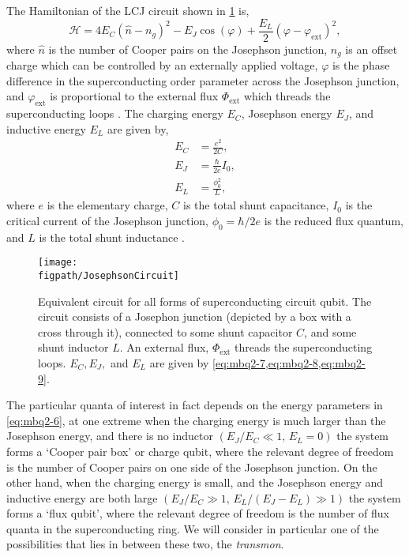The Hamiltonian of the LCJ circuit shown in \cref{fig:mbq2-2} is,
\begin{equation}
	\mathcal{H} = 4E_{C}(\hat{n} - n_{g})^{2} - E_{J}\cos(\varphi) + \frac{E_{L}}{2} (\varphi - \varphi_{\mathrm{ext}})^{2},
	\label{eq:mbq2-6}
\end{equation}
where \(\hat{n}\) is the number of Cooper pairs on the Josephson junction, \(n_{g}\) is an offset charge which can be controlled by an externally applied voltage, \(\varphi\) is the phase difference in the superconducting order parameter across the Josephson junction, and \(\varphi_{\mathrm{ext}}\) is proportional to the external flux \(\Phi_{\mathrm{ext}}\) which threads the superconducting loops \cite{Vool2017}. The charging energy \(E_{C}\), Josephson energy \(E_{J}\), and inductive energy \(E_{L}\) are given by,
\begin{align}
	E_{C} &= \frac{e^{2}}{2C}, \label{eq:mbq2-7} \\
	E_{J} &= \frac{\hbar}{2e}I_{0}, \label{eq:mbq2-8} \\
	E_{L} &= \frac{\phi_{0}^{2}}{L}, \label{eq:mbq2-9}
\end{align}
where \(e\) is the elementary charge, \(C\) is the total shunt capacitance, \(I_{0}\) is the critical current of the Josephson junction, \(\phi_{0} = \hbar/2e\) is the reduced flux quantum, and \(L\) is the total shunt inductance \cite{Vool2017,Wendin2017}.

\begin{figure}[ht!]
\centering
\texttt{[image: \\figpath/JosephsonCircuit]}
\caption{\label{fig:mbq2-2}Equivalent circuit for all forms of superconducting circuit qubit. The circuit consists of a Josephon junction (depicted by a box with a cross through it), connected to some shunt capacitor \(C\), and some shunt inductor \(L\). An external flux, \(\Phi_{\mathrm{ext}}\) threads the superconducting loops. \(E_{C}, E_{J},\) and \(E_{L}\) are given by \cref{eq:mbq2-7,eq:mbq2-8,eq:mbq2-9}.}
\end{figure}

The particular quanta of interest in fact depends on the energy parameters in \cref{eq:mbq2-6}, at one extreme when the charging energy is much larger than the Josephson energy, and there is no inductor \((E_{J} / E_{C} \ll 1,\, E_{L} = 0)\) the system forms a `Cooper pair box' or charge qubit, where the relevant degree of freedom is the number of Cooper pairs on one side of the Josephson junction. On the other hand, when the charging energy is small, and the Josephson energy and inductive energy are both large \(( E_{J} / E_{C} \gg 1,\, E_{L} / (E_{J}-E_{L}) \gg 1 )\) the system forms a `flux qubit', where the relevant degree of freedom is the number of flux quanta in the superconducting ring. We will consider in particular one of the possibilities that lies in between these two, the \emph{transmon}.

